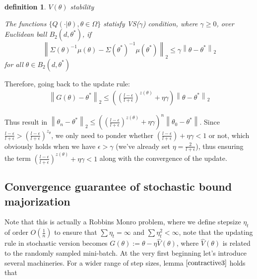 \documentclass{article}
\newtheorem{definition}{definition}
\begin{document}
\begin{definition}{$V(\theta)$ stability}

  The functions $\{Q(\cdot|\theta), \theta \in \Omega\}$ statisfy VS($\gamma$) condition, where $\gamma \geq 0$, over Euclidean ball $B_2(d, \theta^*)$,
  if 
  \begin{equation}
     \left\lVert\Sigma(\theta)^{-1}\mu(\theta) - \Sigma(\theta^*)^{-1}\mu(\theta^*)\right\lVert_2 \leq \gamma  \left\lVert \theta - \theta^*\right\lVert_2
  \end{equation}
  for all $\theta \in B_2(d, \theta^*)$
  \label{Vstable}
\end{definition}

Therefore, going back to the update rule:
\begin{equation}
  \begin{aligned}
    \left\lVert G(\theta) - \theta^* \right\lVert_2  \leq ((\frac{l - \epsilon}{l+\epsilon} )^{z(\theta)} + \eta \gamma)\left\lVert \theta - \theta^* \right\lVert_2 
  \end{aligned}
 \end{equation}

Thus result in $ \left\lVert \theta_n - \theta^* \right\lVert_2  \leq ((\frac{l - \epsilon}{l+\epsilon} )^{z(\theta)} + \eta \gamma)^n \left\lVert \theta_0 - \theta^* \right\lVert $. Since $\frac{l-\epsilon}{l+\epsilon} > (\frac{l-\epsilon}{l+\epsilon})^{z_{\theta}}$,
we only need to ponder whether $(\frac{l - \epsilon}{l+\epsilon} ) + \eta \gamma < 1$ or not, which obviously holds when we have $\epsilon > \gamma$ (we've already set $\eta = \frac{2}{l+\epsilon}$), thus ensuring the term $(\frac{l - \epsilon}{l+\epsilon} )^{z(\theta)} + \eta \gamma < 1$  
along with the convergence of the update. 

\subsection{Convergence guarantee of stochastic bound majorization}

Note that this is actually a Robbins Monro problem, where we define stepsize $\eta_t$ of order $O(\frac{1}{n})$ to ensure that $\sum \eta_t = \infty$ and $\sum \eta_t^2 <\infty $, note that the updating rule
in stochastic version becomes $G(\theta):= \theta - \eta \hat{V}(\theta)$, where $\hat{V}(\theta)$ is related to the randomly sampled mini-batch.
At the very first beginning let's introduce several machineries. For a wider range of step sizes, lemma $\ref{contractive3}$ holds that
\end{document}
